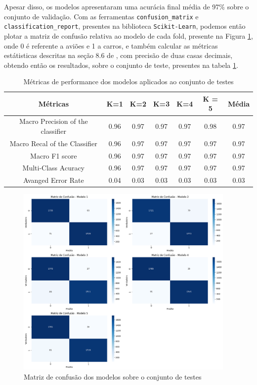 \documentclass[]{abntex2}
\begin{document}
Apesar disso, os modelos apresentaram uma acurácia final média de 97\% sobre o conjunto de validação. Com as ferramentas \texttt{confusion\_matrix} e \texttt{classification\_report}, presentes na biblioteca \texttt{Scikit-Learn}, podemos então plotar a matriz de confusão relativa ao modelo de cada fold, presente na Figura \ref{fig:conf}, onde 0 é referente a aviões e 1 a carros, e também calcular as métricas estátisticas descritas na seção 8.6 de \cite{book}, com precisão de duas casas decimais, obtendo então os resultados, sobre o conjunto de teste, presentes na tabela \ref{tab:acu1}.

\begin{table}[H]
    \centering
    \begin{tabular}{|c|c|c|c|c|c|c|}
    \hline
    \rowcolor[HTML]{C0C0C0} 
    Métricas                          & K=1  & K=2  & K=3  & K=4  & K = 5 & Média \\ \hline
    Macro Precision of the classifier & 0.96 & 0.97 & 0.97 & 0.97 & 0.98 & 0.97  \\ \hline
    Macro Recal of the Classifier     & 0.96 & 0.97 & 0.97 & 0.97 & 0.97 & 0.97  \\ \hline
    Macro F1 score                    & 0.96 & 0.97 & 0.97 & 0.97 & 0.97 & 0.97  \\ \hline
    Multi-Class Acuracy               & 0.96 & 0.97 & 0.97 & 0.97 & 0.97 & 0.97  \\ \hline
    Avanged Error Rate                & 0.04 & 0.03 & 0.03 & 0.03 & 0.03 & 0.03  \\ \hline
    \end{tabular}
    \caption{Métricas de performance dos modelos aplicados ao conjunto de testes}
    \label{tab:acu1}
\end{table}

\begin{figure}[H]
    \centering 
    \includegraphics[width=0.95\textwidth]{imgs/ex2/confusion.png}
    \caption{Matriz de confusão dos modelos sobre o conjunto de testes}
    \label{fig:conf} %
\end{figure}
\end{document}
